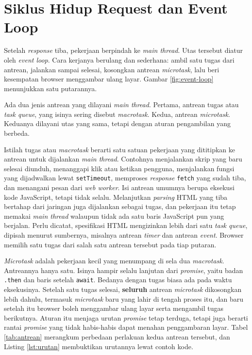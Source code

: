 \section{Siklus Hidup Request dan Event Loop}

Setelah \textit{response} tiba, pekerjaan berpindah ke \textit{main thread}. Utas
tersebut diatur oleh \textit{event loop}. Cara kerjanya berulang dan sederhana:
ambil satu tugas dari antrean, jalankan sampai selesai, kosongkan antrean
\textit{microtask}, lalu beri kesempatan browser menggambar ulang layar. Gambar
\ref{fig:event-loop} menunjukkan satu putarannya.

Ada dua jenis antrean yang dilayani \textit{main thread}. Pertama, antrean
tugas atau \textit{task queue}, yang isinya sering disebut \textit{macrotask}.
Kedua, antrean \textit{microtask}. Keduanya dilayani utas yang sama, tetapi
dengan aturan pengambilan yang berbeda.

Istilah tugas atau \textit{macrotask} berarti satu satuan pekerjaan yang
dititipkan ke antrean untuk dijalankan \textit{main thread}. Contohnya
menjalankan skrip yang baru selesai diunduh, menanggapi klik atau ketikan
pengguna, menjalankan fungsi yang dijadwalkan lewat \texttt{setTimeout},
memproses \textit{response} \texttt{fetch} yang sudah tiba, dan menangani pesan dari
\textit{web worker}. Isi antrean umumnya berupa eksekusi kode JavaScript, tetapi
tidak selalu. Melanjutkan \textit{parsing} HTML yang tiba bertahap dari jaringan
juga dijalankan sebagai tugas, dan pekerjaan itu tetap memakai \textit{main
thread} walaupun tidak ada satu baris JavaScript pun yang berjalan. Perlu dicatat, spesifikasi HTML mengizinkan lebih dari satu
\textit{task queue}, dipisah menurut sumbernya, misalnya antrean \textit{timer}
dan antrean \textit{event}. Browser memilih satu tugas dari salah satu antrean
tersebut pada tiap putaran.

\textit{Microtask} adalah pekerjaan kecil yang menumpang di sela dua
\textit{macrotask}. Antreannya hanya satu.
Isinya hampir selalu lanjutan dari \textit{promise}, yaitu badan \texttt{.then}
dan baris setelah \texttt{await}. Bedanya dengan tugas biasa ada pada waktu
eksekusinya. Setelah satu tugas selesai, \textbf{seluruh} antrean
\textit{microtask} dikosongkan lebih dahulu, termasuk \textit{microtask} baru
yang lahir di tengah proses itu, dan baru setelah itu browser boleh menggambar
ulang layar serta mengambil tugas berikutnya. Aturan itu menjaga urutan
\textit{promise} tetap terduga, tetapi juga berarti rantai \textit{promise}
yang tidak habis-habis dapat menahan penggambaran layar. Tabel
\ref{tab:antrean} merangkum perbedaan perlakuan kedua antrean tersebut, dan
Listing \ref{lst:urutan} membuktikan urutannya lewat contoh kode.

